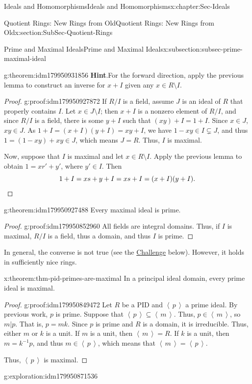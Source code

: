 \documentclass[oneside,10pt,]{book}
\newcommand{\blocktitlefont}{\relax}
\newcommand{\qedhere}{\relax}
\numberwithin{equation}{section}
\newcommand{\ideal}[1]{\left\langle\, #1 \,\right\rangle}
\begin{document}
\begin{chapterptx}{Ideals and Homomorphisms}{}{Ideals and Homomorphisms}{}{}{x:chapter:Sec-Ideals}
\begin{sectionptx}{Quotient Rings: New Rings from Old}{}{Quotient Rings: New Rings from Old}{}{}{x:section:SubSec-Quotient-Rings}
\begin{subsectionptx}{Prime and Maximal Ideals}{}{Prime and Maximal Ideals}{}{}{x:subsection:subsec-prime-maximal-ideal}
\begin{theorem}{}{}{g:theorem:idm179950931856}
\textbf{\blocktitlefont Hint}.\quad{}For the forward direction, apply the previous lemma to construct an inverse for \(x+I\) given any \(x\in R\setminus I\).%
\end{theorem}
\begin{proof}{}{g:proof:idm179950927872}
If \(R/I\) is a field, assume \(J\) is an ideal of \(R\) that properly contains \(I\). Let \(x\in J\setminus I\); then \(x+I\) is a nonzero element of \(R/I\), and since \(R/I\) is a field, there is some \(y+I\) such that \((xy)+I = 1+I\). Since \(x\in J\), \(xy\in J\). As \(1+I = (x+I)(y+I) = xy+I\), we have \(1-xy\in I\subsetneq J\), and thus \(1 = (1-xy)+xy \in J\), which means \(J = R\). Thus, \(I\) is maximal.%
\par
Now, suppose that \(I\) is maximal and let \(x\in R\setminus I\). Apply the previous lemma to obtain \(1 = xr' + y'\), where \(y'\in I\). Then%
\begin{equation*}
1 + I = xs+y + I = xs + I = (x+I)(y+I).\qedhere
\end{equation*}
%
\end{proof}
\begin{theorem}{}{}{g:theorem:idm179950927488}%
Every maximal ideal is prime.%
\end{theorem}
\begin{proof}{}{g:proof:idm179950852960}
All fields are integral domains. Thus, if \(I\) is maximal, \(R/I\) is a field, thus a domain, and thus \(I\) is prime.%
\end{proof}
In general, the converse is not true (see the \hyperref[x:assemblage:challenge-nonmaximal-prime]{Challenge} below). However, it holds in sufficiently nice rings.%
\begin{theorem}{}{}{x:theorem:thm-pid-primes-are-maximal}%
In a principal ideal domain, every prime ideal is maximal.%
\end{theorem}
\begin{proof}{}{g:proof:idm179950849472}
Let \(R\) be a PID and \(\ideal{p}\) a prime ideal. By previous work, \(p\) is prime. Suppose that \(\ideal{p} \subseteq \ideal{m}\). Thus, \(p\in \ideal{m}\), so \(m|p\). That is, \(p = mk\). Since \(p\) is prime and \(R\) is a domain, it is irreducible. Thus, either \(m\) or \(k\) is a unit. If \(m\) is a unit, then \(\ideal{m} = R\). If \(k\) is a unit, then \(m = k^{-1} p\), and thus \(m\in \ideal{p}\), which means that \(\ideal{m} = \ideal{p}\).%
\par
Thus, \(\ideal{p}\) is maximal.%
\end{proof}
\begin{exploration}{}{g:exploration:idm179950871536}%

\end{exploration}
\end{subsectionptx}
\end{sectionptx}
\end{chapterptx}
\end{document}
